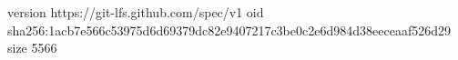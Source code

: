 version https://git-lfs.github.com/spec/v1
oid sha256:1acb7e566c53975d6d69379dc82e9407217c3be0c2e6d984d38eeceaaf526d29
size 5566
